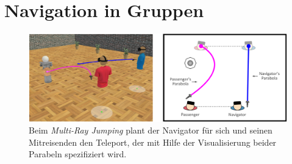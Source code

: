 \section{Navigation in Gruppen}
\begin{figure}[h]
  \centering
  \includegraphics[width=\textwidth]{images/multiray.png}
  \caption{Beim \textit{Multi-Ray Jumping}\cite{WeisskerMulti-RayReality} plant der Navigator für sich und seinen Mitreisenden den Teleport, der mit Hilfe der Visualisierung beider Parabeln spezifiziert wird.}
  \label{fig:todo}
\end{figure}

